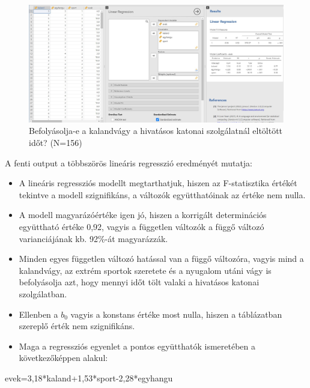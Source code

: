 \documentclass[
  letterpaper,
]{krantz}
\makeatletter
\newenvironment{Shaded}{\begin{snugshade}}{\end{snugshade}}
\newcommand{\InformationTok}[1]{\textcolor[rgb]{0.37,0.37,0.37}{#1}}
\providecommand{\tightlist}{%
  \setlength{\itemsep}{0pt}\setlength{\parskip}{0pt}}\usepackage{longtable,booktabs,array}
\newenvironment{kframe}{%
\medskip{}
\setlength{\fboxsep}{.8em}
 \def\at@end@of@kframe{}%
 \ifinner\ifhmode%
  \def\at@end@of@kframe{\end{minipage}}%
  \begin{minipage}{\columnwidth}%
 \fi\fi%
 \def\FrameCommand##1{\hskip\@totalleftmargin \hskip-\fboxsep
 \colorbox{shadecolor}{##1}\hskip-\fboxsep
     \hskip-\linewidth \hskip-\@totalleftmargin \hskip\columnwidth}%
 \MakeFramed {\advance\hsize-\width
   \@totalleftmargin\z@ \linewidth\hsize
   \@setminipage}}%
 {\par\unskip\endMakeFramed%
 \at@end@of@kframe}
\renewenvironment{Shaded}{\begin{kframe}}{\end{kframe}}
\makeatother
\begin{document}
\begin{figure}

{\centering \includegraphics{./images/lin_reg_katonasag_kep_01.jpg}

}

\caption{Befolyásolja-e a kalandvágy a hivatásos katonai szolgálatnál
eltöltött időt? (N=156)}

\end{figure}

A fenti output a többszörös lineáris regresszió eredményét mutatja:

\begin{itemize}
\tightlist
\item
  A lineáris regressziós modellt megtarthatjuk, hiszen az F-statisztika
  értékét tekintve a modell szignifikáns, a változók együtthatóinak az
  értéke nem nulla.
\item
  A modell magyarázóértéke igen jó, hiszen a korrigált determinációs
  együttható értéke 0,92, vagyis a független változók a függő változó
  varianciájának kb. 92\%-át magyarázzák.
\item
  Minden egyes független változó hatással van a függő változóra, vagyis
  mind a kalandvágy, az extrém sportok szeretete és a nyugalom utáni
  vágy is befolyásolja azt, hogy mennyi időt tölt valaki a hivatásos
  katonai szolgálatban.
\item
  Ellenben a \(b_0\) vagyis a konstans értéke most nulla, hiszen a
  táblázatban szereplő érték nem szignifikáns.
\item
  Maga a regressziós egyenlet a pontos együtthatók ismeretében a
  következőképpen alakul:
\end{itemize}

\begin{Shaded}
\begin{Highlighting}[]
\InformationTok{    evek=3,18*kaland+1,53*sport{-}2,28*egyhangu}
\end{Highlighting}
\end{Shaded}
\end{document}
